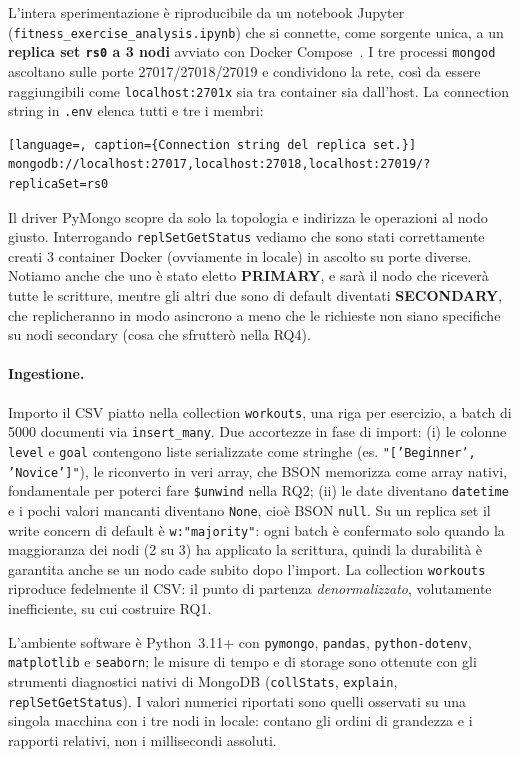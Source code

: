 \documentclass{article}
\begin{document}
L'intera sperimentazione è riproducibile da un notebook Jupyter
(\texttt{fitness\_exercise\_analysis.ipynb}) che si connette, come sorgente unica,
a un \textbf{replica set \texttt{rs0} a 3 nodi} avviato con Docker
Compose~\cite{MongoDBReplication}. I tre processi \texttt{mongod} ascoltano sulle
porte 27017/27018/27019 e condividono la rete, così da essere raggiungibili come
\texttt{localhost:2701x} sia tra container sia dall'host. La connection string in
\texttt{.env} elenca tutti e tre i membri:

\begin{lstlisting}[language=, caption={Connection string del replica set.}]
mongodb://localhost:27017,localhost:27018,localhost:27019/?replicaSet=rs0
\end{lstlisting}

Il driver PyMongo scopre da solo la topologia e indirizza le operazioni al nodo
giusto. Interrogando \texttt{replSetGetStatus} vediamo che sono stati correttamente
creati 3 container Docker (ovviamente in locale) in ascolto su porte diverse.
Notiamo anche che uno è stato eletto \textbf{PRIMARY}, e sarà il nodo che riceverà
tutte le scritture, mentre gli altri due sono di default diventati
\textbf{SECONDARY}, che replicheranno in modo asincrono a meno che le richieste
non siano specifiche su nodi secondary (cosa che sfrutterò nella RQ4).

\paragraph{Ingestione.} Importo il CSV piatto nella collection \texttt{workouts},
una riga per esercizio, a batch di \num{5000} documenti via
\texttt{insert\_many}. Due accortezze in fase di import: (i) le colonne
\texttt{level} e \texttt{goal} contengono liste serializzate come stringhe (es.
\texttt{"['Beginner', 'Novice']"}), le riconverto in veri array, che BSON
memorizza come array nativi, fondamentale per poterci fare \texttt{\$unwind} nella
RQ2; (ii) le date diventano \texttt{datetime} e i pochi valori mancanti diventano
\texttt{None}, cioè BSON \texttt{null}. Su un replica set il write concern di
default è \texttt{w:"majority"}: ogni batch è confermato solo quando la
maggioranza dei nodi (2 su 3) ha applicato la scrittura, quindi la durabilità è
garantita anche se un nodo cade subito dopo l'import. La collection
\texttt{workouts} riproduce fedelmente il CSV: il punto di partenza
\emph{denormalizzato}, volutamente inefficiente, su cui costruire RQ1.

L'ambiente software è Python~3.11+ con \texttt{pymongo}, \texttt{pandas},
\texttt{python-dotenv}, \texttt{matplotlib} e \texttt{seaborn}; le misure di
tempo e di storage sono ottenute con gli strumenti diagnostici nativi di MongoDB
(\texttt{collStats}, \texttt{explain}, \texttt{replSetGetStatus}). I valori
numerici riportati sono quelli osservati su una singola macchina con i tre nodi in
locale: contano gli ordini di grandezza e i rapporti relativi, non i millisecondi
assoluti.
\end{document}
